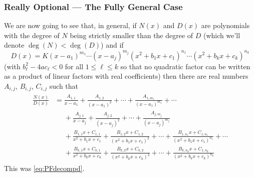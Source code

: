 \subsubsection*{Really Optional --- The Fully General Case}
We are now going to see that, in general, if $N(x)$ and $D(x)$ are polynomials
with the degree of $N$ being strictly smaller than the degree of $D$
(which we'll denote $\deg(N)<\deg(D)$) and if 
\begin{equation*}
D(x)=K(x-a_1)^{m_1}\cdots(x-a_j)^{m_j}
(x^2+b_1x+c_1)^{n_1}\cdots(x^2+b_kx+c_k)^{n_k}
\tag{E1}
\end{equation*}
(with $b_\ell^2-4 ac_\ell<0$ for all $1\le\ell\le k$ so that no 
quadratic factor can be written as a product of linear factors with real coefficients) then there are real numbers $A_{i,j}$, $B_{i,j}$, $C_{i,j}$
such that 
\begin{align*}
\begin{split}
\frac{N(x)}{D(x)}
&=\frac{A_{1,1}}{x-a_1}+\frac{A_{1,2}}{(x-a_1)^2}+\cdots
          +\frac{A_{1,m_1}}{(x-a_1)^{m_1}}+\cdots\\
&\phantom{=}\!+\frac{A_{j,1}}{x-a_j}+\frac{A_{j,2}}{(x-a_j)^2}+\cdots
          +\frac{A_{j,m_j}}{(x-a_j)^{m_j}}\\
&\phantom{=}\!+\frac{B_{1,1}x+C_{1,1}}{x^2+b_1x+c_1}
          +\frac{B_{1,2}x+C_{1,2}}{(x^2+b_1x+c_1)^2}+\!\cdots\!
          +\frac{B_{1,n_1}x+C_{1,n_1}}{(x^2+b_1x+c_1)^{n_1}}\!+\!\cdots\\
&\phantom{=}\!+\frac{B_{k,1}x+C_{k,1}}{x^2+b_kx+c_k}
          +\frac{B_{k,2}x+C_{k,2}}{(x^2+b_kx+c_k)^2}+\!\cdots\!
          +\frac{B_{k,n_k}x+C_{1,n_k}}{(x^2+b_kx+c_k)^{n_k}}
\end{split}
\end{align*}
This was \eqref{eq:PFdecompd}.

